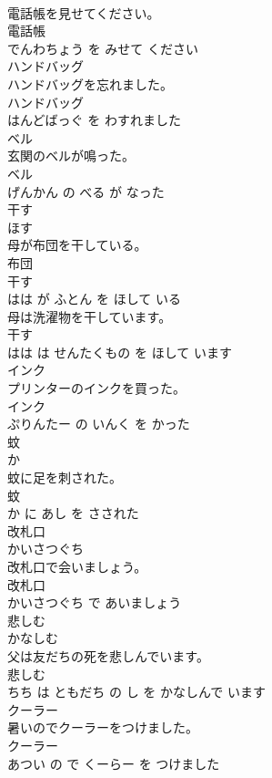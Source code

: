 \documentclass[8pt]{extreport}
\begin{document}
\begin{CJK}{UTF8}{min}
\\	電話帳を見せてください。	
\\	電話帳 
\\	でんわちょう を みせて ください			
\\	ハンドバッグ	
\\	ハンドバッグを忘れました。	
\\	ハンドバッグ 
\\	はんどばっぐ を わすれました			
\\	ベル	
\\	玄関のベルが鳴った。	
\\	ベル 
\\	げんかん の べる が なった			
\\	干す	
\\	ほす			
\\	母が布団を干している。	
\\	布団 
\\	干す 
\\	はは が ふとん を ほして いる			
\\	母は洗濯物を干しています。	
\\	干す 
\\	はは は せんたくもの を ほして います			
\\	インク	
\\	プリンターのインクを買った。	
\\	インク 
\\	ぷりんたー の いんく を かった			
\\	蚊	
\\	か			
\\	蚊に足を刺された。	
\\	蚊 
\\	か に あし を さされた			
\\	改札口	
\\	かいさつぐち			
\\	改札口で会いましょう。	
\\	改札口 
\\	かいさつぐち で あいましょう			
\\	悲しむ	
\\	かなしむ			
\\	父は友だちの死を悲しんでいます。	
\\	悲しむ 
\\	ちち は ともだち の し を かなしんで います			
\\	クーラー	
\\	暑いのでクーラーをつけました。	
\\	クーラー 
\\	あつい の で くーらー を つけました			

\end{CJK}
\end{document}
